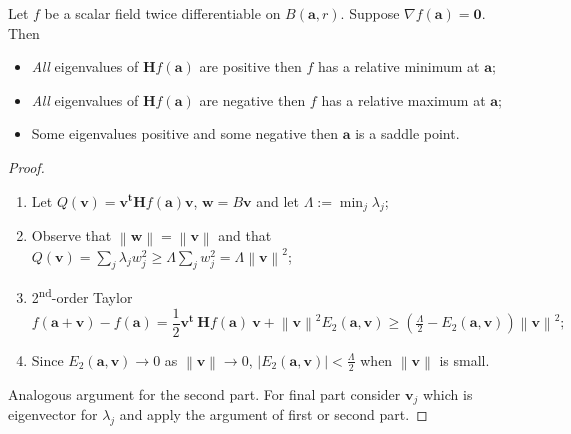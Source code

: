 \documentclass[aspectratio=169,handout]{beamer}
\newcommand{\abs}[1]{\left|#1\right|} %
\newcommand{\norm}[1]{\left\|#1\right\|} %
\renewcommand{\aa}{\mathbf{a}}
\newcommand{\vv}{\mathbf{v}}
\newcommand{\ww}{\mathbf{w}}
\begin{document}
\begin{frame}

    \begin{theorem}
        Let \(f\) be a scalar field twice differentiable on \(B(\aa,r)\).
        Suppose  \(\nabla f(\aa) = \mathbf{0}\).
        Then
        \begin{itemize}
            \item \emph{All} eigenvalues of \(\mathbf{H} f (\aa)\) are positive then \(f\) has a relative minimum at \(\aa\);
            \item \emph{All} eigenvalues of \(\mathbf{H} f (\aa)\) are negative then \(f\) has a relative maximum at \(\aa\);
            \item Some eigenvalues positive and some negative then \(\aa\) is a saddle point.
        \end{itemize}
    \end{theorem}

    \begin{proof}
        \begin{enumerate}
            \item Let \(Q(\vv) =  \vv^{\mathbf{t}} \mathbf{H} f (\aa) \vv  \),  \(\ww = B \vv\) and let \(\Lambda := \min_j \lambda_j\);
            \item Observe that \(\norm{\ww} =  \norm{\vv}\) and that \(Q(\vv)=  \sum_{j} \lambda_j w_j^2  \geq \Lambda \sum_{j} w_j^2 = \Lambda  \norm{\vv}^2 \);
            \item 2\textsuperscript{nd}-order Taylor
                  \vspace{-1em}
                  \[
                      f(\aa+\vv) - f(\aa)
                      =  \frac{1}{2} \vv^{\mathbf{t}} \ \mathbf{H} f (\aa) \ \vv + \norm{\vv}^2 E_2(\aa,\vv)
                      \geq  \left(\tfrac{\Lambda}{2} - E_2(\aa,\vv) \right) \norm{\vv}^2;
                  \]
            \item Since \(E_2(\aa,\vv) \to 0\) as \(\norm{\vv}\to 0\), \(\abs{E_2(\aa,\vv)} < \tfrac{\Lambda}{2}\) when \(\norm{\vv}\) is small.
        \end{enumerate}
        Analogous argument for the second part. For final part consider \(\vv_j\) which is eigenvector for \(\lambda_j\) and apply the argument of first or second part.
    \end{proof}

\end{frame}
\end{document}
